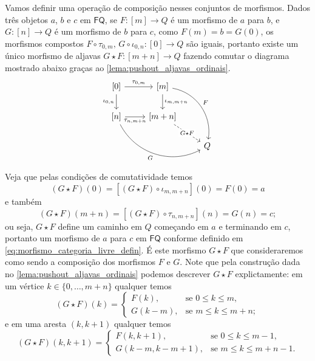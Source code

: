 Vamos definir uma operação de composição nesses conjuntos de morfismos.
Dados três objetos $a$, $b$ e $c$ em $\mathsf{FQ}$, se $F:[m] \to Q$ é um morfismo de $a$ para $b$, e $G:[n] \to Q$ é um morfismo de $b$ para $c$, como $F(m) = b = G(0)$, os morfismos compostos $F \circ \tau_{0,m},\, G \circ \iota_{0,n}: [0] \to Q$ são iguais, portanto existe um único morfismo de aljavas $G \star F: [m+n] \to Q$ fazendo comutar o diagrama mostrado abaixo graças ao \cref{lema:pushout_aljavas_ordinais}.
\begin{displaymath}
    \begin{tikzcd}
        {[0]}
        \arrow[r, "{\tau_{0,m}}"]
        \arrow[d, "{\iota_{0,n}}" swap]
        & {[m]}
        \arrow[d, "\iota_{m,m+n}"]
        \arrow[rdd, bend left=45, "F"]
        \\ {[n]}
        \arrow[r, "{\tau_{n,m+n}}" swap]
        \arrow[rrd, bend right=45, "G" swap]
        & {[m+n]}
        \arrow[rd, dashed, "G \star F" description]
        \\ & & Q
    \end{tikzcd}
\end{displaymath}
Veja que pelas condições de comutatividade temos
\begin{displaymath}
    (G \star F)(0) = [(G \star F) \circ \iota_{m,m+n}](0) = F(0) = a
\end{displaymath}
e também
\begin{displaymath}
    (G \star F)(m+n) = [(G \star F) \circ \tau_{n,m+n}](n) = G(n) = c;
\end{displaymath}
ou seja, $G \star F$ define um caminho em $Q$ começando em $a$ e terminando em $c$, portanto um morfismo de $a$ para $c$ em $\mathsf{FQ}$ conforme definido em \eqref{eq:morfismo_categoria_livre_defin}.
É este morfismo $G \star F$ que consideraremos como sendo a composição dos morfismos $F$ e $G$.
Note que pela construção dada no \cref{lema:pushout_aljavas_ordinais} podemos descrever $G \star F$ explictamente: em um vértice $k \in \{0,\dots,m+n\}$ qualquer temos
\begin{equation}\label{eq:composicao_caminhos_aljava_1}
    (G \star F)(k) =
    \begin{cases}
        F(k), & \text{se } 0 \leq k \leq m, \\
        G(k-m), & \text{se } m \leq k \leq m+n;
    \end{cases}
\end{equation}
e em uma aresta $(k,k+1)$ qualquer temos
\begin{equation}\label{eq:composicao_caminhos_aljava_2}
    (G \star F)(k,k+1) =
    \begin{cases}
        F(k,k+1), & \text{se } 0 \leq k \leq m-1, \\
        G(k-m,k-m+1), & \text{se } m \leq k \leq m+n-1.
    \end{cases}
\end{equation}

